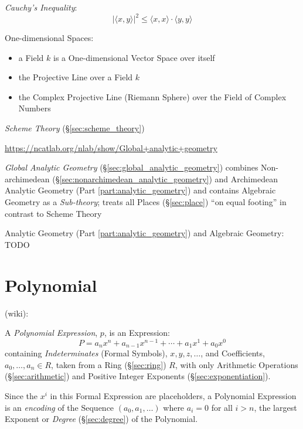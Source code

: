 \emph{Cauchy's Inequality}:
\[
    |\langle x,y \rangle|^2 \leq \langle x,x \rangle \cdot \langle
    y,y \rangle
\]

One-dimensional Spaces:
\begin{itemize}
\item a Field $k$ is a One-dimensional Vector Space over itself
\item the Projective Line over a Field $k$
\item the Complex Projective Line (Riemann Sphere) over the Field of Complex
  Numbers
\end{itemize}

\emph{Scheme Theory} (\S\ref{sec:scheme_theory})

\url{https://ncatlab.org/nlab/show/Global+analytic+geometry}

\emph{Global Analytic Geometry} (\S\ref{sec:global_analytic_geometry}) combines
Non-archimedean (\S\ref{sec:nonarchimedean_analytic_geometry}) and Archimedean
Analytic Geometry (Part \ref{part:analytic_geometry}) and contains Algebraic
Geometry as a \emph{Sub-theory}; treats all Places (\S\ref{sec:place}) ``on
equal footing'' in contrast to Scheme Theory

\asterism

Analytic Geometry (Part \ref{part:analytic_geometry}) and Algebraic Geometry:
TODO



\section{Polynomial}\label{sec:polynomial}

(wiki):

A \emph{Polynomial Expression}, $p$, is an Expression:
\[
  P = a_n x^n + a_{n-1}x^{n-1} + \cdots + a_1 x^1 + a_0 x^0
\]
containing \emph{Indeterminates} (Formal Symbols), $x, y, z, \ldots$, and
Coefficients, $a_0, \ldots, a_n \in R$, taken from a Ring (\S\ref{sec:ring})
$R$, with only Arithmetic Operations (\S\ref{sec:arithmetic}) and Positive
Integer Exponents (\S\ref{sec:exponentiation}).

Since the $x^i$ in this Formal Expression are placeholders, a Polynomial
Expression is an \emph{encoding} of the Sequence $(a_0, a_1, \ldots)$ where $a_i
= 0$ for all $i > n$, the largest Exponent or \emph{Degree} (\S\ref{sec:degree})
of the Polynomial.

